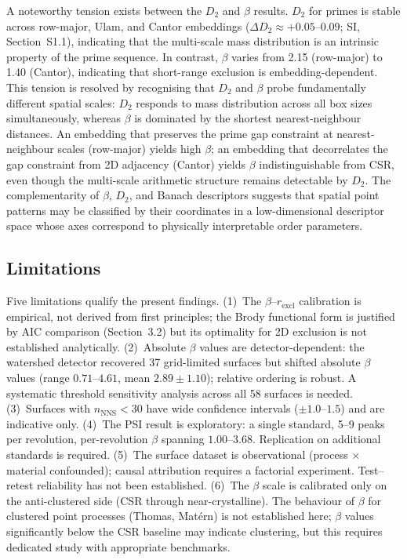\documentclass[final,3p,times,twocolumn]{elsarticle}
\theoremstyle{definition}
\begin{document}
A noteworthy tension exists between the $D_2$ and $\beta$ results.
$D_2$ for primes is stable across row-major, Ulam, and Cantor
embeddings ($\Delta D_2\approx+0.05$--$0.09$; SI, Section~S1.1),
indicating that the multi-scale mass distribution is an intrinsic
property of the prime sequence. In contrast, $\beta$ varies from
2.15 (row-major) to 1.40 (Cantor), indicating that short-range
exclusion is embedding-dependent. This tension is resolved by
recognising that $D_2$ and $\beta$ probe fundamentally different
spatial scales: $D_2$ responds to mass distribution across all box
sizes simultaneously, whereas $\beta$ is dominated by the shortest
nearest-neighbour distances. An embedding that preserves the prime
gap constraint at nearest-neighbour scales (row-major) yields high
$\beta$; an embedding that decorrelates the gap constraint from 2D
adjacency (Cantor) yields $\beta$ indistinguishable from CSR, even
though the multi-scale arithmetic structure remains detectable by
$D_2$. The complementarity of $\beta$, $D_2$, and Banach descriptors
suggests that spatial point patterns may be classified by their
coordinates in a low-dimensional descriptor space whose axes
correspond to physically interpretable order parameters.

\subsection{Limitations}

Five limitations qualify the present findings. (1)~The
$\beta$--$r_{\text{excl}}$ calibration is empirical, not derived from
first principles; the Brody functional form is justified by AIC
comparison (Section~3.2) but its optimality for 2D exclusion is not
established analytically. (2)~Absolute $\beta$ values are
detector-dependent: the watershed detector recovered 37 grid-limited
surfaces but shifted absolute $\beta$ values (range $0.71$--$4.61$,
mean $2.89\pm1.10$); relative ordering is robust. A systematic
threshold sensitivity analysis across all 58 surfaces is needed.
(3)~Surfaces with $n_{\text{NNS}}<30$ have wide confidence intervals
($\pm1.0$--$1.5$) and are indicative only.
(4)~The PSI result is exploratory: a single standard, 5--9 peaks per
revolution, per-revolution $\beta$ spanning $1.00$--$3.68$. Replication
on additional standards is required.
(5)~The surface dataset is observational (process $\times$ material
confounded); causal attribution requires a factorial experiment.
Test--retest reliability has not been established.
(6)~The $\beta$ scale is calibrated only on the anti-clustered side
(CSR through near-crystalline). The behaviour of $\beta$ for clustered
point processes (Thomas, Mat\'ern) is not established here; $\beta$
values significantly below the CSR baseline may indicate clustering,
but this requires dedicated study with appropriate benchmarks.
\end{document}
